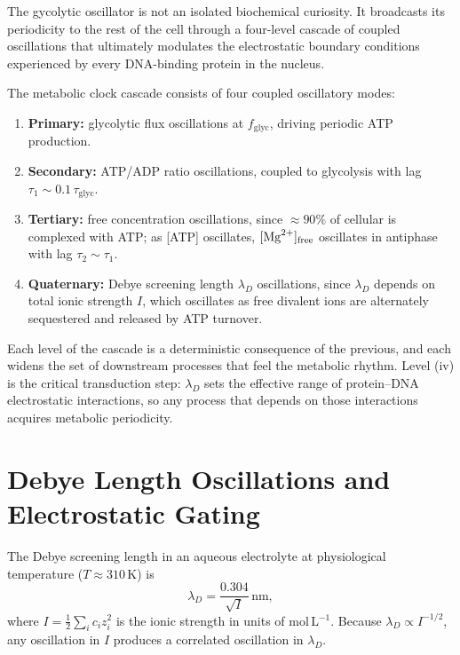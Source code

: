 The gycolytic oscillator is not an isolated biochemical curiosity. It
broadcasts its periodicity to the rest of the cell through a four-level
cascade of coupled oscillations that ultimately modulates the electrostatic
boundary conditions experienced by every DNA-binding protein in the nucleus.

\begin{definition}
\label{def:clock_cascade}
The metabolic clock cascade consists of four coupled oscillatory modes:
\begin{enumerate}[label=(\roman*)]
  \item \textbf{Primary:} glycolytic flux oscillations at $f_{\mathrm{glyc}}$,
        driving periodic ATP production.
  \item \textbf{Secondary:} ATP/ADP ratio oscillations, coupled to glycolysis
        with lag $\tau_1 \sim 0.1\,\tau_{\mathrm{glyc}}$.
  \item \textbf{Tertiary:} free  concentration oscillations, since
        $\approx 90\%$ of cellular  is complexed with ATP;
        as [ATP] oscillates, $[\ce{Mg^{2+}}]_{\mathrm{free}}$ oscillates in
        antiphase with lag $\tau_2 \sim \tau_1$.
  \item \textbf{Quaternary:} Debye screening length $\lambda_D$ oscillations,
        since $\lambda_D$ depends on total ionic strength $I$, which oscillates
        as free divalent ions are alternately sequestered and released by ATP
        turnover.
\end{enumerate}
\end{definition}

Each level of the cascade is a deterministic consequence of the previous, and
each widens the set of downstream processes that feel the metabolic rhythm.
Level (iv) is the critical transduction step: $\lambda_D$ sets the effective
range of protein--DNA electrostatic interactions, so any process that depends
on those interactions acquires metabolic periodicity.

\section{Debye Length Oscillations and Electrostatic Gating}
\label{sec:debye_oscillations}

The Debye screening length in an aqueous electrolyte at physiological
temperature ($T \approx 310\,\text{K}$) is
\begin{equation}
  \lambda_D = \frac{0.304}{\sqrt{I}}\,\text{nm},
  \label{eq:debye_length}
\end{equation}
where $I = \tfrac{1}{2}\sum_i c_i z_i^2$ is the ionic strength in units of
mol\,L$^{-1}$. Because $\lambda_D \propto I^{-1/2}$, any oscillation in $I$
produces a correlated oscillation in $\lambda_D$.

